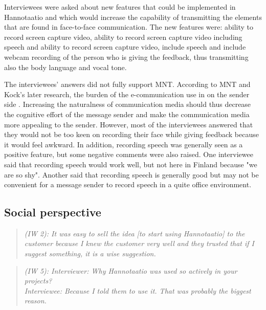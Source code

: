 \documentclass[english,12pt,a4paper,pdftex]{article}
\newcommand{\q}[2]{
\begin{quote}
\emph{(IW #1): #2}
\end{quote}}
\begin{document}
Interviewees were asked about new features that could be implemented in Hannotaatio and which would increase the capability of transmitting the elements that are found in face-to-face communication. The new features were: ability to record screen capture video, ability to record screen capture video including speech and ability to record screen capture video, include speech and include webcam recording of the person who is giving the feedback, thus transmitting also the body language and vocal tone.

The interviewees' answers did not fully support \ac{MNT}. According to \ac{MNT} and Kock's later research, the burden of the e-communication use in on the sender side \citep{kock2007}. Increasing the naturalness of communication media should thus decrease the cognitive effort of the message sender and make the communication media more appealing to the sender. However, most of the interviewees answered that they would not be too keen on recording their face while giving feedback because it would feel awkward. In addition, recording speech was generally seen as a positive feature, but some negative comments were also raised. One interviewee said that recording speech would work well, but not here in Finland because "we are so shy". Another said that recording speech is generally good but may not be convenient for a message sender to record speech in a quite office environment.

\subsection{Social perspective}

\q{2}{It was easy to sell the idea [to start using Hannotaatio] to the customer because I knew the customer very well and they trusted that if I suggest something, it is a wise suggestion.}

\q{5}{Interviewer: Why Hannotaatio was used so actively in your projects? \\ Interviewee: Because I told them to use it. That was probably the biggest reason.}
\end{document}
